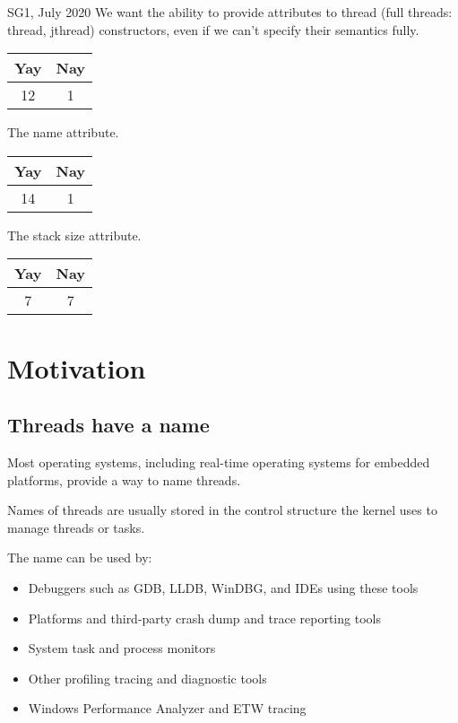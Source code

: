 \documentclass{wg21}
\begin{document}
\begin{quoteblock}
SG1, July 2020
We want the ability to provide attributes to thread (full threads: thread, jthread) constructors, even if we can't specify their semantics fully.

\begin{tabular}{|c|c|}
\hline
Yay & Nay\\
\hline
12 & 1 \\
\hline
\end{tabular}
\end{quoteblock}
\begin{quoteblock}
The name attribute.

\begin{tabular}{|c|c|}
\hline
Yay & Nay\\
\hline
14 & 1 \\
\hline
\end{tabular}
\end{quoteblock}
\begin{quoteblock}
The stack size attribute.

\begin{tabular}{|c|c|}
\hline
Yay & Nay\\
\hline
7 & 7 \\
\hline
\end{tabular}
\end{quoteblock}


\section{Motivation}

\subsection{Threads have a name}

Most operating systems, including real-time operating systems for embedded platforms, provide a way to name threads.

Names of threads are usually stored in the control structure the kernel uses to manage threads or tasks.

The name can be used by:
\begin{itemize}
    \item Debuggers such as GDB, LLDB, WinDBG, and IDEs using these tools
    \item Platforms and third-party crash dump and trace reporting tools
    \item System task and process monitors
    \item Other profiling tracing and diagnostic tools
    \item Windows Performance Analyzer and ETW tracing
\end{itemize}
\end{document}
